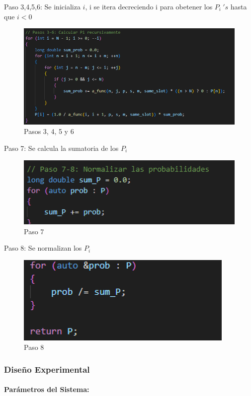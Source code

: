 \documentclass{article}
\begin{document}
Paso 3,4,5,6: Se inicializa $i$, i se itera decreciendo i para obetener los $P_i \ 's$ hasta que $i<0$

\begin{figure}[H]
    \centering
    \includegraphics[width=0.75\linewidth]{images/imageGeoGeoMCalc7.png}
    \caption{Pasos 3, 4, 5 y 6}
    \label{fig:enter-label}
\end{figure}

Paso 7: Se calcula la sumatoria de los $P_i$
\begin{figure}[H]
    \centering
    \includegraphics[width=0.5\linewidth]{images/imageGeoGeoMCalc8.png}
    \caption{Paso 7}
    \label{fig:enter-label}
\end{figure}

Paso 8: Se normalizan los $P_i$
\begin{figure}[H]
    \centering
    \includegraphics[width=0.5\linewidth]{images/imageGeoGeoMCalc9.png}
    \caption{Paso 8}
    \label{fig:enter-label}
\end{figure}

\subsubsection{Diseño Experimental}

\paragraph{Parámetros del Sistema:}
\end{document}
